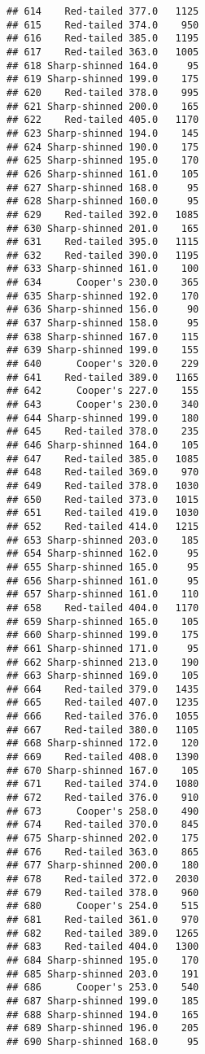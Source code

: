 \documentclass[
]{article}
\begin{document}
\begin{verbatim}
## 614    Red-tailed 377.0   1125
## 615    Red-tailed 374.0    950
## 616    Red-tailed 385.0   1195
## 617    Red-tailed 363.0   1005
## 618 Sharp-shinned 164.0     95
## 619 Sharp-shinned 199.0    175
## 620    Red-tailed 378.0    995
## 621 Sharp-shinned 200.0    165
## 622    Red-tailed 405.0   1170
## 623 Sharp-shinned 194.0    145
## 624 Sharp-shinned 190.0    175
## 625 Sharp-shinned 195.0    170
## 626 Sharp-shinned 161.0    105
## 627 Sharp-shinned 168.0     95
## 628 Sharp-shinned 160.0     95
## 629    Red-tailed 392.0   1085
## 630 Sharp-shinned 201.0    165
## 631    Red-tailed 395.0   1115
## 632    Red-tailed 390.0   1195
## 633 Sharp-shinned 161.0    100
## 634      Cooper's 230.0    365
## 635 Sharp-shinned 192.0    170
## 636 Sharp-shinned 156.0     90
## 637 Sharp-shinned 158.0     95
## 638 Sharp-shinned 167.0    115
## 639 Sharp-shinned 199.0    155
## 640      Cooper's 320.0    229
## 641    Red-tailed 389.0   1165
## 642      Cooper's 227.0    155
## 643      Cooper's 230.0    340
## 644 Sharp-shinned 199.0    180
## 645    Red-tailed 378.0    235
## 646 Sharp-shinned 164.0    105
## 647    Red-tailed 385.0   1085
## 648    Red-tailed 369.0    970
## 649    Red-tailed 378.0   1030
## 650    Red-tailed 373.0   1015
## 651    Red-tailed 419.0   1030
## 652    Red-tailed 414.0   1215
## 653 Sharp-shinned 203.0    185
## 654 Sharp-shinned 162.0     95
## 655 Sharp-shinned 165.0     95
## 656 Sharp-shinned 161.0     95
## 657 Sharp-shinned 161.0    110
## 658    Red-tailed 404.0   1170
## 659 Sharp-shinned 165.0    105
## 660 Sharp-shinned 199.0    175
## 661 Sharp-shinned 171.0     95
## 662 Sharp-shinned 213.0    190
## 663 Sharp-shinned 169.0    105
## 664    Red-tailed 379.0   1435
## 665    Red-tailed 407.0   1235
## 666    Red-tailed 376.0   1055
## 667    Red-tailed 380.0   1105
## 668 Sharp-shinned 172.0    120
## 669    Red-tailed 408.0   1390
## 670 Sharp-shinned 167.0    105
## 671    Red-tailed 374.0   1080
## 672    Red-tailed 376.0    910
## 673      Cooper's 258.0    490
## 674    Red-tailed 370.0    845
## 675 Sharp-shinned 202.0    175
## 676    Red-tailed 363.0    865
## 677 Sharp-shinned 200.0    180
## 678    Red-tailed 372.0   2030
## 679    Red-tailed 378.0    960
## 680      Cooper's 254.0    515
## 681    Red-tailed 361.0    970
## 682    Red-tailed 389.0   1265
## 683    Red-tailed 404.0   1300
## 684 Sharp-shinned 195.0    170
## 685 Sharp-shinned 203.0    191
## 686      Cooper's 253.0    540
## 687 Sharp-shinned 199.0    185
## 688 Sharp-shinned 194.0    165
## 689 Sharp-shinned 196.0    205
## 690 Sharp-shinned 168.0     95

\end{verbatim}
\end{document}
